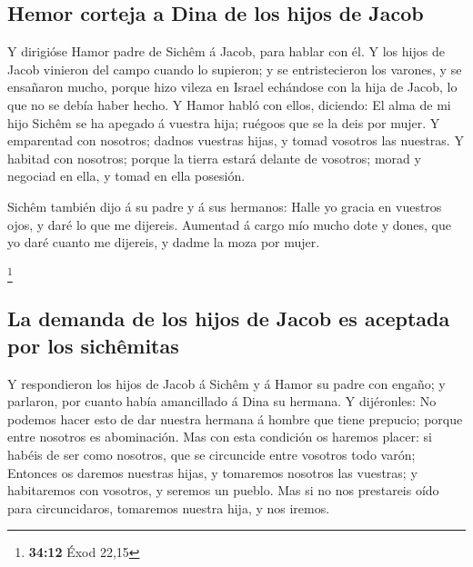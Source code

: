 \hypertarget{hemor-corteja-a-dina-de-los-hijos-de-jacob}{%
\subsection{Hemor corteja a Dina de los hijos de
Jacob}\label{hemor-corteja-a-dina-de-los-hijos-de-jacob}}

 Y dirigióse Hamor padre de Sichêm á Jacob, para hablar
con él.  Y los hijos de Jacob vinieron del campo cuando lo
supieron; y se entristecieron los varones, y se ensañaron mucho, porque
hizo vileza en Israel echándose con la hija de Jacob, lo que no se debía
haber hecho.  Y Hamor habló con ellos, diciendo: El alma
de mi hijo Sichêm se ha apegado á vuestra hija; ruégoos que se la deis
por mujer.  Y emparentad con nosotros; dadnos vuestras
hijas, y tomad vosotros las nuestras.  Y habitad con
nosotros; porque la tierra estará delante de vosotros; morad y negociad
en ella, y tomad en ella posesión.

 Sichêm también dijo á su padre y á sus hermanos: Halle
yo gracia en vuestros ojos, y daré lo que me dijereis. 
Aumentad á cargo mío mucho dote y dones, que yo daré cuanto me dijereis,
y dadme la moza por mujer.

\footnote{\textbf{34:12} Éxod 22,15}

\hypertarget{la-demanda-de-los-hijos-de-jacob-es-aceptada-por-los-sichuxeamitas}{%
\subsection{La demanda de los hijos de Jacob es aceptada por los
sichêmitas}\label{la-demanda-de-los-hijos-de-jacob-es-aceptada-por-los-sichuxeamitas}}

 Y respondieron los hijos de Jacob á Sichêm y á Hamor su
padre con engaño; y parlaron, por cuanto había amancillado á Dina su
hermana.  Y dijéronles: No podemos hacer esto de dar
nuestra hermana á hombre que tiene prepucio; porque entre nosotros es
abominación.  Mas con esta condición os haremos placer:
si habéis de ser como nosotros, que se circuncide entre vosotros todo
varón;  Entonces os daremos nuestras hijas, y tomaremos
nosotros las vuestras; y habitaremos con vosotros, y seremos un pueblo.
 Mas si no nos prestareis oído para circuncidaros,
tomaremos nuestra hija, y nos iremos.

